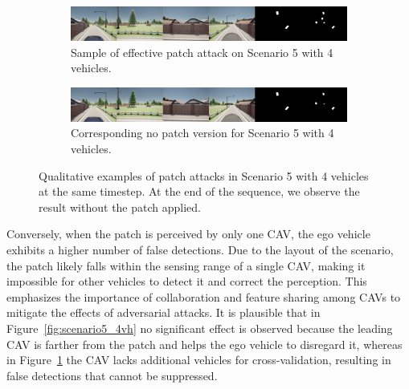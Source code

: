 \begin{figure}[tph]
    \centering

    \begin{subfigure}[b]{1\textwidth}
        \centering
        \includegraphics[width=\textwidth]{figures/results/scenario5.png}
        \caption{Sample of effective patch attack on Scenario 5 with 4 vehicles.}
        \label{fig:scenario5_4vh_effect}
    \end{subfigure}
    \vspace{0.5cm}

    \begin{subfigure}[b]{1\textwidth}
        \centering
        \includegraphics[width=\textwidth]{figures/results/scenario5gt.png}
        \caption{Corresponding no patch version for Scenario 5 with 4 vehicles.}
        \label{fig:scenario5_gt4vh_effect}
    \end{subfigure}
    \caption{
        Qualitative examples of patch attacks in Scenario 5 with 4 vehicles at the same timestep.
        At the end of the sequence, we observe the result without the patch applied.
    }
    \label{fig:scenario5_4vh_v2}
\end{figure}

Conversely, when the patch is perceived by only one CAV, the ego vehicle exhibits a higher number of false detections.
Due to the layout of the scenario, the patch likely falls within the sensing range of a single CAV, making it impossible for other vehicles to detect it and correct the perception.
This emphasizes the importance of collaboration and feature sharing among CAVs to mitigate the effects of adversarial attacks.
It is plausible that in Figure~\ref{fig:scenario5_4vh} no significant effect is observed because the leading CAV is farther from the patch and helps the ego vehicle to disregard it, whereas in Figure~\ref{fig:scenario5_4vh_effect} the CAV lacks additional vehicles for cross-validation, resulting in false detections that cannot be suppressed.